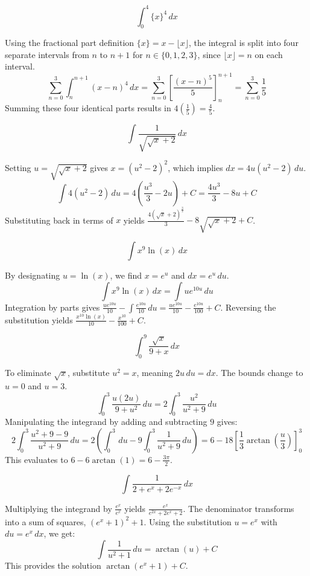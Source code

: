\begin{questions}
    \question \[ \int_{0}^{4}\{x\}^{4} \,dx \]
    \begin{solution}
        Using the fractional part definition $\{x\}=x-\lfloor x\rfloor$, the integral is split into four separate intervals from $n$ to $n+1$ for $n \in \{0, 1, 2, 3\}$, since $\lfloor x\rfloor=n$ on each interval.
        \[ \sum_{n=0}^{3}\int_{n}^{n+1}(x-n)^{4} \,dx = \sum_{n=0}^{3} \left[ \frac{(x-n)^{5}}{5} \right]_{n}^{n+1} = \sum_{n=0}^{3} \frac{1}{5} \]
        Summing these four identical parts results in $4\left(\frac{1}{5}\right) = \frac{4}{5}$.
    \end{solution}

    \question \[ \int\frac{1}{\sqrt{\sqrt{x}+2}} \,dx \]
    \begin{solution}
        Setting $u=\sqrt{\sqrt{x}+2}$ gives $x=(u^{2}-2)^{2}$, which implies $dx=4u(u^{2}-2) \,du$.
        \[ \int 4(u^{2}-2) \,du = 4\left(\frac{u^{3}}{3}-2u\right)+C = \frac{4u^{3}}{3}-8u+C \]
        Substituting back in terms of $x$ yields $\frac{4(\sqrt{x}+2)^{\frac{3}{2}}}{3}-8\sqrt{\sqrt{x}+2}+C$.
    \end{solution}

    \question \[ \int x^{9}\ln(x) \,dx \]
    \begin{solution}
        By designating $u=\ln(x)$, we find $x=e^{u}$ and $dx=e^{u} \,du$.
        \[ \int x^{9}\ln(x) \,dx = \int ue^{10u} \,du \]
        Integration by parts gives $\frac{ue^{10u}}{10} - \int\frac{e^{10u}}{10} \,du = \frac{ue^{10u}}{10} - \frac{e^{10u}}{100} + C$. Reversing the substitution yields $\frac{x^{10}\ln(x)}{10}-\frac{x^{10}}{100}+C$.
    \end{solution}

    \question \[ \int_{0}^{9}\frac{\sqrt{x}}{9+x} \,dx \]
    \begin{solution}
        To eliminate $\sqrt{x}$, substitute $u^{2}=x$, meaning $2u \,du=dx$. The bounds change to $u=0$ and $u=3$.
        \[ \int_{0}^{3}\frac{u(2u)}{9+u^{2}} \,du = 2\int_{0}^{3}\frac{u^{2}}{u^{2}+9} \,du \]
        Manipulating the integrand by adding and subtracting $9$ gives:
        \[ 2\int_{0}^{3}\frac{u^{2}+9-9}{u^{2}+9} \,du = 2\left(\int_{0}^{3} \,du - 9\int_{0}^{3}\frac{1}{u^{2}+9} \,du\right) = 6 - 18\left[\frac{1}{3}\arctan\left(\frac{u}{3}\right)\right]_{0}^{3} \]
        This evaluates to $6 - 6\arctan(1) = 6 - \frac{3\pi}{2}$.
    \end{solution}

    \question \[ \int\frac{1}{2+e^{x}+2e^{-x}} \,dx \]
    \begin{solution}
        Multiplying the integrand by $\frac{e^{x}}{e^{x}}$ yields $\frac{e^{x}}{e^{2x}+2e^{x}+2}$.
        The denominator transforms into a sum of squares, $(e^{x}+1)^{2}+1$. Using the substitution $u=e^{x}$ with $du=e^{x} \,dx$, we get:
        \[ \int\frac{1}{u^{2}+1} \,du = \arctan(u)+C \]
        This provides the solution $\arctan(e^{x}+1)+C$.
    \end{solution}


\end{questions}
